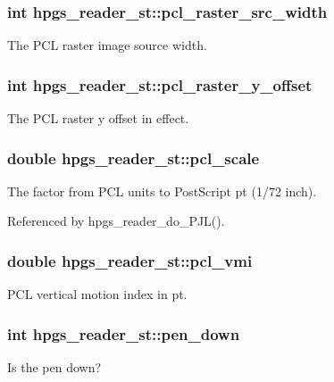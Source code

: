 \subsubsection[{pcl\_\-raster\_\-src\_\-width}]{\setlength{\rightskip}{0pt plus 5cm}int {\bf hpgs\_\-reader\_\-st::pcl\_\-raster\_\-src\_\-width}}\label{structhpgs__reader__st_a2c2def9afb39268366d8dd182ceeda4c}
The PCL raster image source width. 
\subsubsection[{pcl\_\-raster\_\-y\_\-offset}]{\setlength{\rightskip}{0pt plus 5cm}int {\bf hpgs\_\-reader\_\-st::pcl\_\-raster\_\-y\_\-offset}}\label{structhpgs__reader__st_ac65b9460273bfccc7b48a152c617cf24}
The PCL raster y offset in effect. 
\subsubsection[{pcl\_\-scale}]{\setlength{\rightskip}{0pt plus 5cm}double {\bf hpgs\_\-reader\_\-st::pcl\_\-scale}}\label{structhpgs__reader__st_ada48ebf583e0870b81f7be402ff6f911}
The factor from PCL units to PostScript pt (1/72 inch). 

Referenced by hpgs\_\-reader\_\-do\_\-PJL().

\subsubsection[{pcl\_\-vmi}]{\setlength{\rightskip}{0pt plus 5cm}double {\bf hpgs\_\-reader\_\-st::pcl\_\-vmi}}\label{structhpgs__reader__st_a893a7337617fd19a6f48b071c378d7bf}
PCL vertical motion index in pt. 
\subsubsection[{pen\_\-down}]{\setlength{\rightskip}{0pt plus 5cm}int {\bf hpgs\_\-reader\_\-st::pen\_\-down}}\label{structhpgs__reader__st_a9f2449aee3d9f7e7faad17bd61918567}
Is the pen down? 
